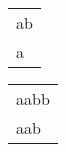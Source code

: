 \begin{tabular}{|l|} \hline
ab \\
a\  \\
\hline
\end{tabular} 
\begin{tabular}{|l|} \hline
aabb \\
aab\  \\
\hline
\end{tabular} 
